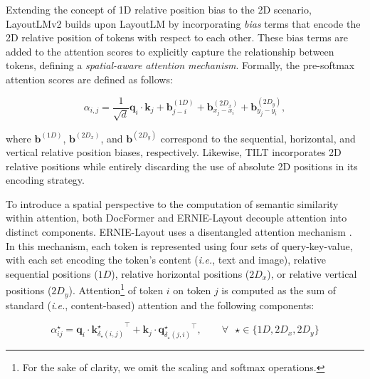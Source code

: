 Extending the concept of 1D relative position bias \citep{raffel2020exploring} to the 2D scenario, LayoutLMv2 \citep{xu2020layoutlmv2} builds upon LayoutLM by incorporating \textit{bias} terms that encode the 2D relative position of tokens with respect to each other. These bias terms are added to the attention scores to explicitly capture the relationship between tokens, defining a \textit{spatial-aware attention mechanism}. Formally, the pre-softmax attention scores are defined as follows:

\begin{equation}
    \alpha_{i,j} = \dfrac{1}{\sqrt{d}} \bm{q}_i \cdot \bm{k}_j + \bm{b}^{(1D)}_{j - i} + \bm{b}^{(2D_x)}_{x_j - x_i} + \bm{b}^{(2D_y)}_{y_j - y_i},
\end{equation}

\noindent where $\bm{b}^{(1D)}$, $\bm{b}^{(2D_x)}$, and $\bm{b}^{(2D_y)}$ correspond to the sequential, horizontal, and vertical relative position biases, respectively. Likewise, TILT \citep{powalski2021going} incorporates 2D relative positions while entirely discarding the use of absolute 2D positions in its encoding strategy. 

To introduce a spatial perspective to the computation of semantic similarity within attention, both DocFormer \citep{appalaraju2021docformer} and ERNIE-Layout \citep{peng2022ernie} decouple attention into distinct components. 
ERNIE-Layout uses a disentangled attention mechanism \citep{he2020deberta}. In this mechanism, each token is represented using four sets of query-key-value, with each set encoding the token's content (\textit{i.e.}, text and image), relative sequential positions ($1D$), relative horizontal positions ($2D_x$), or relative vertical positions ($2D_y$). Attention\footnote{For the sake of clarity, we omit the scaling and softmax operations.} of token $i$ on token $j$ is computed as the sum of standard (\textit{i.e.}, content-based) attention and the following components: 

\begin{equation}
        \alpha^{\star}_{ij} = \bm{q}_i \cdot {\bm{k}^{\star}_{\delta_{\star}(i, j)}}^{\top} + \bm{k}_j \cdot {\bm{q}^{\star}_{\delta_{\star}(j, i)}}^{\top}, \qquad \forall \text{ } \star \in \{1D, 2D_x, 2D_y\}
\label{equation:ernie-layout-attention}
\end{equation}


